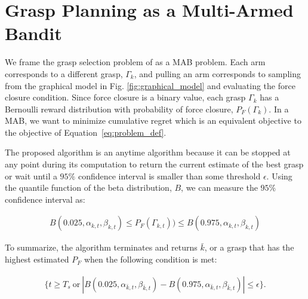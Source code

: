\documentclass[10pt, conference]{ieeeconf}      %
\begin{document}
\section{Grasp Planning as a Multi-Armed Bandit}
We frame the grasp selection problem of  as a MAB problem.
Each arm corresponds to a different grasp, $\Gamma_k$, and pulling an arm corresponds to sampling from the graphical model in Fig. \ref{fig:graphical_model} and evaluating the force closure condition. Since force closure is a binary value, each grasp $\Gamma_k$ has a Bernoulli reward distribution with probability of force closure, $P_F(\Gamma_k)$.
In a MAB, we want to minimize cumulative regret which is an equivalent objective to the objective of Equation~\ref{eq:problem_def}.

The proposed algorithm is an anytime algorithm because it can be stopped at any point during its computation to return the current estimate of the best grasp or wait until a $95\%$ confidence interval is smaller than some threshold $\epsilon$. Using the quantile function of the beta distribution, $B$, we can measure the $95\%$ confidence interval as: 

\vspace{-2ex}
\begin{align}\label{eq:confidence}
B(0.025,\alpha_{k,t},\beta_{k,t}) \leq P_F(\Gamma_{k,t})) \leq B(0.975,\alpha_{k,t},\beta_{k,t})
\end{align}

To summarize, the algorithm terminates and returns $\bar{k}$, or a grasp that has the highest estimated $P_F$ when the following condition is met:

\vspace{-2ex}
\begin{align}\label{eq:stopping_condition}
\lbrace t \geq T_s \: \mbox{or} \: |B(0.025,\alpha_{\bar{k},t},\beta_{\bar{k},t}) -  B(0.975,\alpha_{\bar{k},t},\beta_{\bar{k},t})| \leq \epsilon \rbrace.
\end{align}
\end{document}
